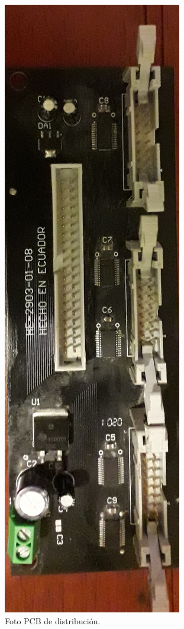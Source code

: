 \begin{figure}[htpb]
	\centering
    \includegraphics[scale=0.1]{Figures/pcbdistri.jpg} 
	\caption{Foto PCB de distribución.}
	\label{fig:fotopcbdistri}
\end{figure}

